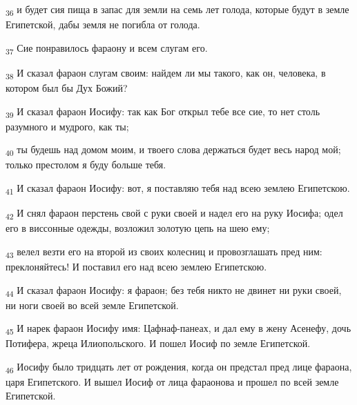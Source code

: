 \begin{tcolorbox}
\textsubscript{36} и будет сия пища в запас для земли на семь лет голода, которые будут в земле Египетской, дабы земля не погибла от голода.
\end{tcolorbox}
\begin{tcolorbox}
\textsubscript{37} Сие понравилось фараону и всем слугам его.
\end{tcolorbox}
\begin{tcolorbox}
\textsubscript{38} И сказал фараон слугам своим: найдем ли мы такого, как он, человека, в котором был бы Дух Божий?
\end{tcolorbox}
\begin{tcolorbox}
\textsubscript{39} И сказал фараон Иосифу: так как Бог открыл тебе все сие, то нет столь разумного и мудрого, как ты;
\end{tcolorbox}
\begin{tcolorbox}
\textsubscript{40} ты будешь над домом моим, и твоего слова держаться будет весь народ мой; только престолом я буду больше тебя.
\end{tcolorbox}
\begin{tcolorbox}
\textsubscript{41} И сказал фараон Иосифу: вот, я поставляю тебя над всею землею Египетскою.
\end{tcolorbox}
\begin{tcolorbox}
\textsubscript{42} И снял фараон перстень свой с руки своей и надел его на руку Иосифа; одел его в виссонные одежды, возложил золотую цепь на шею ему;
\end{tcolorbox}
\begin{tcolorbox}
\textsubscript{43} велел везти его на второй из своих колесниц и провозглашать пред ним: преклоняйтесь! И поставил его над всею землею Египетскою.
\end{tcolorbox}
\begin{tcolorbox}
\textsubscript{44} И сказал фараон Иосифу: я фараон; без тебя никто не двинет ни руки своей, ни ноги своей во всей земле Египетской.
\end{tcolorbox}
\begin{tcolorbox}
\textsubscript{45} И нарек фараон Иосифу имя: Цафнаф-панеах, и дал ему в жену Асенефу, дочь Потифера, жреца Илиопольского. И пошел Иосиф по земле Египетской.
\end{tcolorbox}
\begin{tcolorbox}
\textsubscript{46} Иосифу было тридцать лет от рождения, когда он предстал пред лице фараона, царя Египетского. И вышел Иосиф от лица фараонова и прошел по всей земле Египетской.
\end{tcolorbox}
